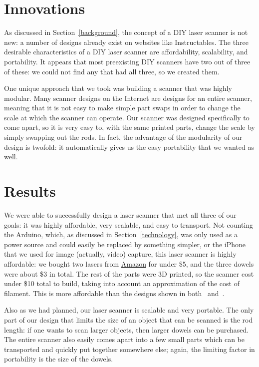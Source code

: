 \documentclass[12pt, letterpaper]{article}
\begin{document}
\section{Innovations}

As discussed in Section~\ref{background}, the concept of a DIY laser scanner is
not new: a number of designs already exist on websites like Instructables. The
three desirable characteristics of a DIY laser scanner are affordability,
scalability, and portability. It appears that most preexisting DIY scanners have
two out of three of these: we could not find any that had all three, so we created
them.

One unique approach that we took was building a scanner that was highly modular.
Many scanner designs on the Internet are designs for an entire scanner, meaning
that it is not easy to make simple part swaps in order to change the scale at which
the scanner can operate. Our scanner was designed specifically to come apart, so
it is very easy to, with the same printed parts, change the scale by simply swapping
out the rods. In fact, the advantage of the modularity of our design is twofold:
it automatically gives us the easy portability that we wanted as well.

\section{Results} \label{results}

We were able to successfully design a laser scanner that met all three of our
goals: it was highly affordable, very scalable, and easy to transport.
Not counting the Arduino, which, as discussed in Section~\ref{technology},
was only used as a power source and could easily be replaced by something
simpler, or the iPhone that we used for image (actually, video) capture,
this laser scanner is highly affordable: we bought two lasers from
\href{http://www.amazon.com/Focusable-650nm-Module-driver-Plastic/dp/B00S1EXW3Y}{Amazon}
for under \$5, and the three dowels were about \$3 in total. The rest of the
parts were 3D printed, so the scanner cost under \$10 total to build, taking into
account an approximation of the cost of filament. This is more affordable than
the designs shown in both~\cite{dentroman} and~\cite{sardau}.

Also as we had planned, our laser scanner is scalable and very portable.
The only part of our design that limits the size of an object that can be scanned
is the rod length: if one wants to scan larger objects, then larger dowels can
be purchased. The entire scanner also easily comes apart into a few small parts
which can be transported and quickly put together somewhere else; again, the
limiting factor in portability is the size of the dowels.
\end{document}
